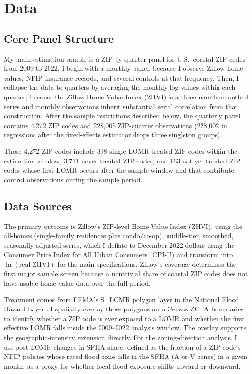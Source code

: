 \documentclass[12pt]{article}
\begin{document}
\section{Data}\label{sec:data}

\subsection{Core Panel Structure}\label{sec:data_panel}

My main estimation sample is a ZIP-by-quarter panel for U.S.\ coastal ZIP codes from 2009 to 2022. I begin with a monthly panel, because I observe Zillow home values, NFIP insurance records, and several controls at that frequency. Then, I collapse the data to quarters by averaging the monthly log values within each quarter, because the Zillow Home Value Index (ZHVI) is a three-month smoothed series and monthly observations inherit substantial serial correlation from that construction. After the sample restrictions described below, the quarterly panel contains 4,272 ZIP codes and 228,005 ZIP-quarter observations (228,002 in regressions after the fixed-effects estimator drops three singleton groups).

Those 4,272 ZIP codes include 398 single-LOMR treated ZIP codes within the estimation window, 3,711 never-treated ZIP codes, and 163 not-yet-treated ZIP codes whose first LOMR occurs after the sample window and that contribute control observations during the sample period.

\subsection{Data Sources}\label{sec:data_sources}
The primary outcome is Zillow's ZIP-level Home Value Index (ZHVI), using the all-homes (single-family residences plus condo/co-op), middle-tier, smoothed, seasonally adjusted series, which I deflate to December 2022 dollars using the Consumer Price Index for All Urban Consumers (CPI-U) \citep{FRED_CPI} and transform into $\ln(\text{real ZHVI})$ for the main specifications. Zillow's coverage determines the first major sample screen because a nontrivial share of coastal ZIP codes does not have usable home-value data over the full period.

Treatment comes from FEMA's S\_LOMR polygon layer in the National Flood Hazard Layer \citep{FEMA_LOMR}. I spatially overlay those polygons onto Census ZCTA boundaries \citep{Census_ZCTA} to identify whether a ZIP code is ever exposed to a LOMR and whether the first effective LOMR falls inside the 2009--2022 analysis window. The overlay supports the geographic-intensity extension directly. For the zoning-direction analysis, I use post-LOMR changes in SFHA share, defined as the fraction of a ZIP code's NFIP policies whose rated flood zone falls in the SFHA (A or V zones) in a given month, as a proxy for whether local flood exposure shifts upward or downward.
\end{document}

